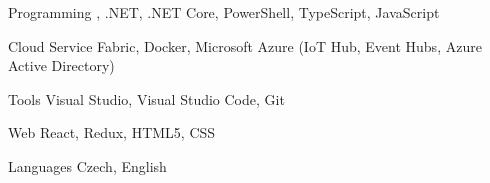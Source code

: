 

\begin{cvskills}

  \cvskill
    {Programming} %
    {\Csharp, .NET, .NET Core, PowerShell, TypeScript, JavaScript} %

  \cvskill
    {Cloud} %
    {Service Fabric, Docker, Microsoft Azure (IoT Hub, Event Hubs, Azure Active Directory)} %

  \cvskill
    {Tools} %
    {Visual Studio, Visual Studio Code, Git} %

  \cvskill
    {Web} %
    {React, Redux, HTML5, CSS} %

  \cvskill
    {Languages} %
    {Czech, English} %

\end{cvskills}
